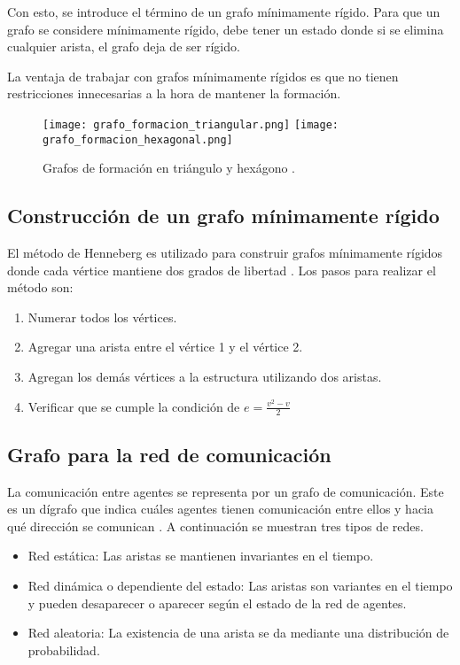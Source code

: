 Con esto, se introduce el término de un grafo mínimamente rígido. Para que un grafo se considere mínimamente rígido, debe tener un estado donde si se elimina cualquier arista, el grafo deja de ser rígido.

La ventaja de trabajar con grafos mínimamente rígidos es que no tienen restricciones innecesarias a la hora de mantener la formación.

\begin{figure}[H]
	\centering
	\texttt{[image: grafo\_formacion\_triangular.png]}
	\texttt{[image: grafo\_formacion\_hexagonal.png]}
	\caption{Grafos de formación en triángulo y hexágono \cite{PenaAM_2019_tesis}.}
	\label{fig:grafos_formación}
\end{figure}

\subsection{Construcción de un grafo mínimamente rígido}
El método de Henneberg es utilizado para construir grafos mínimamente rígidos donde cada vértice mantiene dos grados de libertad \cite{KrickL_2007_tesis}. Los pasos para realizar el método son:

\begin{enumerate}
	\item Numerar todos los vértices.
	\item Agregar una arista entre el vértice 1 y el vértice 2.
	\item Agregan los demás vértices a la estructura utilizando dos aristas.
	\item Verificar que se cumple la condición de $e = \frac{v^2-v}{2}$
\end{enumerate}


\subsection{Grafo para la red de comunicación}
La comunicación entre agentes se representa por un grafo de comunicación. Este es un dígrafo que indica cuáles agentes tienen comunicación entre ellos y hacia qué dirección se comunican \cite{grafos_en_redes_multiagente}. A continuación se muestran tres tipos de redes.

\begin{itemize}
	\item Red estática: Las aristas se mantienen invariantes en el tiempo.
	\item Red dinámica o dependiente del estado: Las aristas son variantes en el tiempo y pueden desaparecer o aparecer según el estado de la red de agentes.
	\item Red aleatoria: La existencia de una arista se da mediante una distribución de probabilidad.
\end{itemize}

